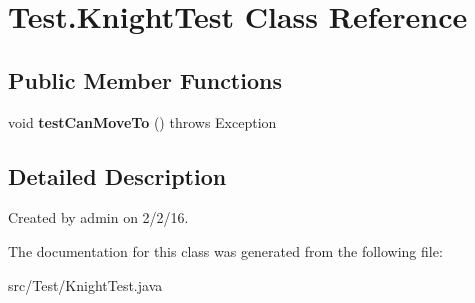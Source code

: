 \hypertarget{class_test_1_1_knight_test}{}\section{Test.\+Knight\+Test Class Reference}
\label{class_test_1_1_knight_test}
\subsection*{Public Member Functions}
\begin{DoxyCompactItemize}
\item 
void {\bfseries test\+Can\+Move\+To} ()  throws Exception \hypertarget{class_test_1_1_knight_test_afa1a6bb7cf41d2ae99758f464300ab7b}{}\label{class_test_1_1_knight_test_afa1a6bb7cf41d2ae99758f464300ab7b}

\end{DoxyCompactItemize}


\subsection{Detailed Description}
Created by admin on 2/2/16. 

The documentation for this class was generated from the following file\+:\begin{DoxyCompactItemize}
\item 
src/\+Test/Knight\+Test.\+java\end{DoxyCompactItemize}
